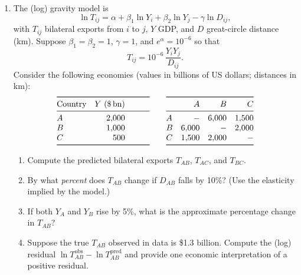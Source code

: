 \documentclass[11pt]{article}
\begin{document}
\begin{enumerate}[leftmargin=*, resume]
\item
The (log) gravity model is
\[
\ln T_{ij}=\alpha + \beta_1 \ln Y_i + \beta_2 \ln Y_j - \gamma \ln D_{ij},
\]
with $T_{ij}$ bilateral exports from $i$ to $j$, $Y$ GDP, and $D$ great-circle distance (km). Suppose $\beta_1=\beta_2=1$, $\gamma=1$, and $e^\alpha=10^{-6}$ so that
\[
T_{ij}=10^{-6}\,\frac{Y_i Y_j}{D_{ij}}.
\]
Consider the following economies (values in billions of US dollars; distances in km):
\[
\begin{array}{@{}lrrrr@{}}
\toprule
\text{Country} & Y \ (\$\,\text{bn}) & & & \\
\midrule
A & 2{,}000 &&&\\
B & 1{,}000 &&&\\
C & \phantom{0}500 &&&\\
\bottomrule
\end{array}
\qquad
\begin{array}{@{}lrrr@{}}
\toprule
 & A & B & C\\
\midrule
A & - & 6{,}000 & 1{,}500\\
B & 6{,}000 & - & 2{,}000\\
C & 1{,}500 & 2{,}000 & - \\
\bottomrule
\end{array}
\]
\begin{enumerate}
\item Compute the predicted bilateral exports $T_{AB}$, $T_{AC}$, and $T_{BC}$.
\item By what \emph{percent} does $T_{AB}$ change if $D_{AB}$ falls by 10\%? (Use the elasticity implied by the model.)
\item If both $Y_A$ and $Y_B$ rise by 5\%, what is the approximate percentage change in $T_{AB}$?
\item Suppose the true $T_{AB}$ observed in data is \$\num{1.3} billion. Compute the (log) residual $\ln T^{\text{obs}}_{AB}-\ln T^{\text{pred}}_{AB}$ and provide one economic interpretation of a positive residual.
\end{enumerate}


\end{enumerate}
\end{document}
